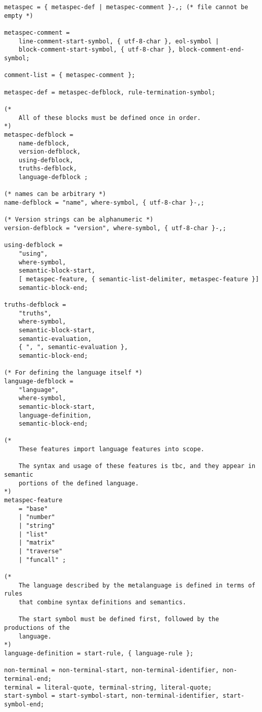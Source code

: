 \begin{lstlisting}
metaspec = { metaspec-def | metaspec-comment }-,; (* file cannot be empty *)

metaspec-comment =
    line-comment-start-symbol, { utf-8-char }, eol-symbol |
    block-comment-start-symbol, { utf-8-char }, block-comment-end-symbol;

comment-list = { metaspec-comment };

metaspec-def = metaspec-defblock, rule-termination-symbol;

(* 
    All of these blocks must be defined once in order.
*)
metaspec-defblock = 
    name-defblock, 
    version-defblock, 
    using-defblock, 
    truths-defblock,
    language-defblock ;

(* names can be arbitrary *)
name-defblock = "name", where-symbol, { utf-8-char }-,;

(* Version strings can be alphanumeric *)
version-defblock = "version", where-symbol, { utf-8-char }-,;

using-defblock =
    "using",
    where-symbol,
    semantic-block-start,
    [ metaspec-feature, { semantic-list-delimiter, metaspec-feature }]
    semantic-block-end;

truths-defblock =
    "truths",
    where-symbol, 
    semantic-block-start,
    semantic-evaluation,
    { ", ", semantic-evaluation },
    semantic-block-end;

(* For defining the language itself *)
language-defblock =
    "language",
    where-symbol,
    semantic-block-start,
    language-definition,
    semantic-block-end;

(* 
    These features import language features into scope.

    The syntax and usage of these features is tbc, and they appear in semantic
    portions of the defined language.
*)
metaspec-feature
    = "base"
    | "number"
    | "string"
    | "list"
    | "matrix"
    | "traverse"
    | "funcall" ;

(*
    The language described by the metalanguage is defined in terms of rules 
    that combine syntax definitions and semantics.

    The start symbol must be defined first, followed by the productions of the
    language.
*)
language-definition = start-rule, { language-rule };

non-terminal = non-terminal-start, non-terminal-identifier, non-terminal-end;
terminal = literal-quote, terminal-string, literal-quote;
start-symbol = start-symbol-start, non-terminal-identifier, start-symbol-end;


\end{lstlisting}
